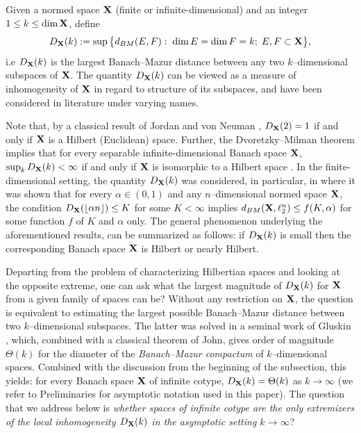 \documentclass[11pt]{amsart}
\theoremstyle{definition}
\theoremstyle{plain}
\begin{document}
\smallskip

Given a normed space ${\bf X}$ (finite or
infinite-dimensional) and an integer $1\leq k\leq \dim{\bf X}$,
define
$$
D_{\bf X}(k):=\sup\big\{
d_{BM}(E,F):\;\dim E=\dim F=k;\;E,F\subset {\bf X}
\big\},
$$
i.e $D_{\bf X}(k)$ is the largest Banach--Mazur
distance between any two $k$--dimensional subspaces of ${\bf X}$.
The quantity $D_{\bf X}(k)$ can be viewed as
a measure of inhomogeneity of ${\bf X}$
in regard to structure of its subspaces,
and have been considered in literature under varying names.

\smallskip

Note that, by a classical result of Jordan and von Neuman \cite{JvN35},
$D_{\bf X}(2)=1$ if and only if ${\bf X}$ is a Hilbert (Euclidean) space.
Further, the Dvoretzky--Milman theorem \cite{Dv,Mil}
implies that for every separable infinite-dimensional
Banach space ${\bf X}$, $\sup\nolimits_k D_{\bf X}(k)<\infty$
if and only if ${\bf X}$ is isomorphic to a Hilbert space \cite{Kwapien}.
In the finite-dimensional setting,
the quantity $D_{\bf X}(k)$ was considered, in particular,
in \cite{BourgainD,MTJD} where it was shown that
for every $\alpha\in(0,1)$ and any $n$--dimensional
normed space ${\bf X}$, the condition
$D_{\bf X}(\lfloor \alpha n\rfloor)\leq K$
for some $K<\infty$ implies $d_{BM}({\bf X},\ell_2^n)\leq f(K,\alpha)$
for some function $f$ of $K$ and $\alpha$ only.
The general phenomenon underlying the aforementioned
results, can be summarized as follows: if $D_{\bf X}(k)$
is small then the corresponding Banach space ${\bf X}$
is Hilbert or nearly Hilbert.

Departing from the problem of characterizing
Hilbertian spaces and looking at the opposite extreme,
one can ask what the largest magnitude of $D_{\bf X}(k)$
for ${\bf X}$ from a given family of spaces can be?
Without any restriction on ${\bf X}$,
the question is equivalent to estimating the largest
possible Banach--Mazur distance between
two $k$--dimensional subspaces.
The latter was solved in a seminal work of Gluskin \cite{Gluskin},
which, combined with
a classical theorem of John,
gives order of magnitude $\Theta(k)$
for the diameter of the {\it Banach--Mazur compactum}
of $k$--dimensional spaces.
Combined with the discussion from the beginning of the subsection,
this yields: for every Banach space ${\bf X}$
of infinite cotype, $D_{\bf X}(k)=\Theta(k)$ as $k\to\infty$
(we refer to Preliminaries for asymptotic notation used in this paper).
The question that we address below is {\it whether
spaces of infinite cotype are the only extremizers
of the local inhomogeneity $D_{\bf X}(k)$ in the asymptotic setting $k\to\infty$}?
\end{document}
